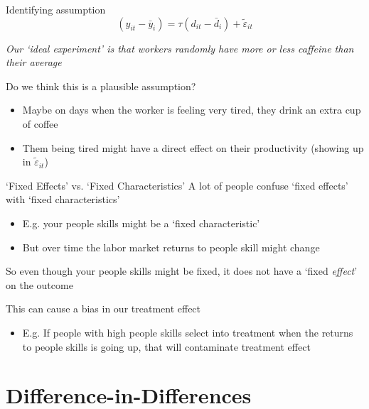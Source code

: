 \documentclass[aspectratio=169,t,11pt,table]{beamer}
\begin{document}
\begin{frame}{Identifying assumption}
  \vspace*{-\bigskipamount}
  $$
    \left(y_{it} - \bar{y}_i\right) = \tau \left(d_{it} - \bar{d}_i\right) + \tilde{\varepsilon}_{it}
  $$
  
  \emph{Our `ideal experiment' is that workers \emph{randomly} have more or less caffeine than their average}

  \bigskip
  Do we think this is a plausible assumption? 
  \pause
  \begin{itemize}
    \item Maybe on days when the worker is feeling very tired, they drink an extra cup of coffee
    \item Them being tired might have a direct effect on their productivity (showing up in $\tilde{\varepsilon}_{it}$)
  \end{itemize}
\end{frame}



\begin{frame}{`Fixed Effects' vs. `Fixed Characteristics'}
  A lot of people confuse `fixed effects' with `fixed characteristics'
  \begin{itemize}
    \item E.g. your people skills might be a `fixed characteristic'
    
    \item But over time the labor market returns to people skill might change
  \end{itemize}

  \bigskip
  So even though your people skills might be fixed, it does not have a `fixed \emph{effect}' on the outcome

  \pause
  \bigskip
  This can cause a bias in our treatment effect
  \begin{itemize}
    \item E.g. If people with high people skills select into treatment when the returns to people skills is going up, that will contaminate treatment effect
  \end{itemize}
\end{frame}



\section{Difference-in-Differences}
\end{document}
